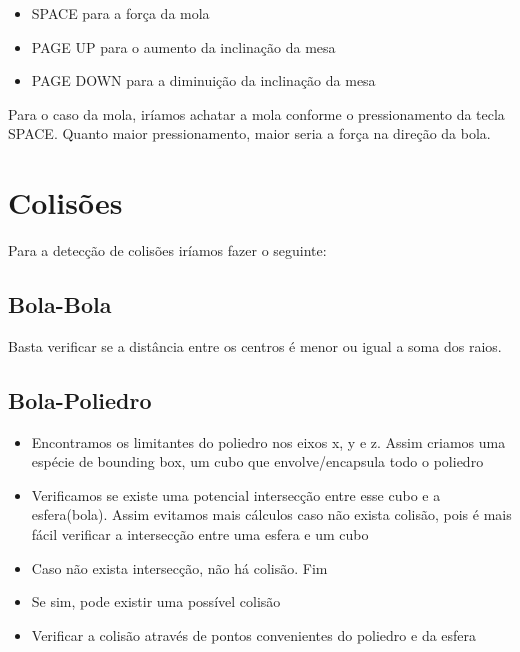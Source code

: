 \documentclass[a4paper,12pt]{article}
\begin{document}
\begin{itemize}
\item SPACE para a força da mola
\item PAGE UP para o aumento da inclinação da mesa
\item PAGE DOWN para a diminuição da inclinação da mesa
\end{itemize}

Para o caso da mola, iríamos achatar a mola conforme o pressionamento da tecla SPACE. Quanto maior pressionamento, maior seria a força na direção da bola. 

\section{Colisões}
\mbox{}

Para a detecção de colisões iríamos fazer o seguinte:

\subsection{Bola-Bola}
\mbox{}

Basta verificar se a distância entre os centros é menor ou igual a soma dos raios.

\subsection{Bola-Poliedro}
\mbox{}

\begin{itemize}
\item Encontramos os limitantes do poliedro nos eixos x, y e z. Assim criamos uma espécie de bounding box, um cubo que envolve/encapsula todo o poliedro
\item Verificamos se existe uma potencial intersecção entre esse cubo e a esfera(bola). Assim evitamos mais cálculos caso não exista colisão, pois é mais
  fácil verificar a intersecção entre uma esfera e um cubo
\item Caso não exista intersecção, não há colisão. Fim
\item Se sim, pode existir uma possível colisão
\item Verificar a colisão através de pontos convenientes do poliedro e da esfera
  
\end{itemize}
\end{document}
